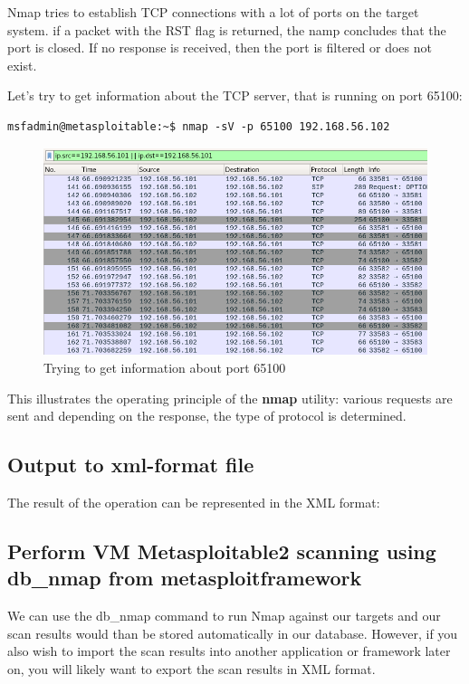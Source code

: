 \documentclass[14pt,a4paper,report]{report}
\begin{document}
Nmap tries to establish TCP connections with a lot of ports on the target system. if a packet with the RST flag is returned, the namp concludes that the port is closed. If no response is received, then the port is filtered or does not exist.

Let's try to get information about the TCP server, that is running on port 65100:

\begin{verbatim}
msfadmin@metasploitable:~$ nmap -sV -p 65100 192.168.56.102
\end{verbatim}

\begin{figure}[h!]
	\centering
	\includegraphics[scale = 0.53]{images/5.png}
	\caption{Trying to get information about port 65100}
\end{figure}

This illustrates the operating principle of the \textbf{nmap} utility: various requests are sent and depending on the response, the type of protocol is determined.

\subsection{Output to xml-format file}

The result of the operation can be represented in the XML format:



\subsection{Perform VM Metasploitable2 scanning using db\_nmap from metasploitframework}

We can use the db\_nmap command to run Nmap against our targets and our scan results would than be stored automatically in our database. However, if you also wish to import the scan results into another application or framework later on, you will likely want to export the scan results in XML format.
\end{document}
